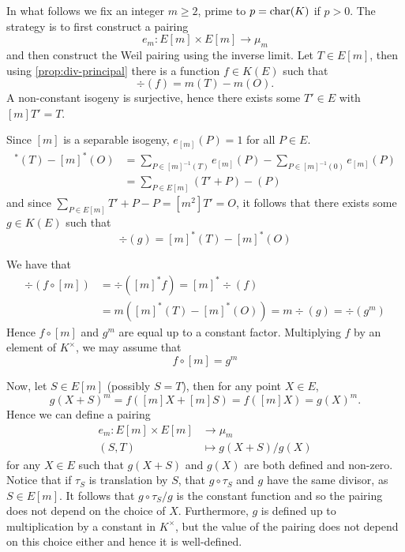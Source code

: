 In what follows we fix an integer $m \geq 2$,
prime to $p = \operatorname{char}(K)$ if $p > 0$.
The strategy is to first construct a pairing
\begin{equation*}
	e_m: E[m] \times E[m] \to \mu_m
\end{equation*}
and then construct the Weil pairing using the inverse limit.
Let $T \in E[m]$, then using \ref{prop:div-principal}
there is a function $f \in K(E)$ such that
\begin{equation*}
	\div(f) = m(T) - m(O).
\end{equation*}
A non-constant isogeny is surjective, hence there exists some $T' \in E$
with $[m]T' = T$. 

Since $[m]$ is a separable isogeny, $e_{[m]}(P) = 1$ for all $P \in E$.
\begin{align*}
	[m]^*(T) - [m]^*(O) &= \sum_{P \in [m]^{-1}(T)}e_{[m]}(P) - \sum_{P \in
	[m]^{-1}(0)}e_{[m]}(P)\\
	&= \sum_{P \in E[m]}(T' + P) - (P)
\end{align*}
and since $\sum_{P \in E[m]} T' + P - P = [m^2]T' = O$, it follows that there
exists some $g \in K(E)$ such that
\begin{equation*}
	\div(g) = [m]^*(T) - [m]^*(O)
\end{equation*}

We have that
\begin{align*}
	\div(f\circ [m]) &= \div([m]^*f) = [m]^*\div(f) \\
	&= m\left([m]^*(T) - [m]^*(O)\right) = m\div(g) = \div(g^m)
\end{align*}
Hence $f\circ[m]$ and $g^m$ are equal up to a constant factor. Multiplying $f$
by an element of $K^\times$, we may assume that
\begin{equation*}
	f\circ [m] = g^m
\end{equation*}

Now, let $S \in E[m]$ (possibly $S = T$), then for any point $X \in E$,
\begin{equation*}
	g(X + S)^m = f([m]X + [m]S) = f([m]X) = g(X)^m.
\end{equation*}
Hence we can define a pairing
\begin{align*}
	e_m: E[m] \times E[m] &\to \mu_m\\
	(S, T) &\mapsto g(X + S)/g(X)
\end{align*}
for any $X \in E$ such that $g(X + S)$ and $g(X)$ are both defined and
non-zero. Notice that if $\tau_S$ is translation by $S$, that 
$g\circ \tau_S$ and $g$ have the same divisor, as $S \in E[m]$. It follows that 
$g\circ \tau_S/g$ is the constant function and so the pairing does not depend on
the choice of $X$. Furthermore, $g$ is defined up to multiplication by a
constant in $K^\times$, but the value of the pairing does not depend on this
choice either and hence it is well-defined.

